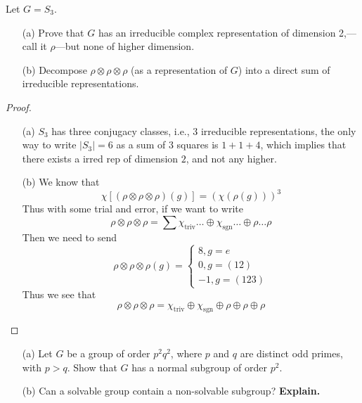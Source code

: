 \documentclass[openany]{book}
\begin{document}
\begin{prob}
    Let \(G = S_3\).
    \begin{itemize}
        \item[(a)] Prove that \(G\) has an irreducible complex representation of dimension 2,—call it \(\rho\)—but none of higher dimension.
        \item[(b)] Decompose \(\rho \otimes \rho \otimes \rho\) (as a representation of \(G\)) into a direct sum of irreducible representations.
    \end{itemize}
\end{prob}
\begin{proof}
    \begin{itemize}
        \item[(a)] $S_3$ has three conjugacy classes, i.e., $3$ irreducible representations, the only way to write $|S_3|=6$ as a sum of $3$ squares is $1+1+4$, which implies that there exists a irred rep of dimension $2$, and not any higher.
        \item[(b)] We know that 
        \begin{equation*}
            \chi\left[(\rho\otimes\rho\otimes\rho)(g)\right]=\left(\chi(\rho(g))\right)^3
        \end{equation*}
        Thus with some trial and error, if we want to write 
        \begin{equation*}
            \rho\otimes\rho\otimes\rho=\sum \chi_{\text{triv}}\dots\oplus\chi_{\text{sgn}}\dots \oplus\rho\dots\rho
        \end{equation*}
        Then we need to send 
        \begin{equation*}
            \rho\otimes\rho\otimes\rho(g)=\begin{cases}
                8, g=e\\
                0, g=(12)\\
                -1, g=(123)
            \end{cases}
        \end{equation*}
        Thus we see that 
        \begin{equation*}
            \rho\otimes\rho\otimes\rho=\chi_{\text{triv}}\oplus\chi_{\text{sgn}}\oplus\rho\oplus\rho\oplus\rho
        \end{equation*}
    \end{itemize}
\end{proof}



\begin{prob}
    \begin{itemize}
        \item[(a)] Let \(G\) be a group of order \(p^2q^2\), where \(p\) and \(q\) are distinct odd primes, with \(p > q\). Show that \(G\) has a normal subgroup of order \(p^2\).
        \item[(b)] Can a solvable group contain a non-solvable subgroup? \textbf{Explain.}
    \end{itemize}
\end{prob}
\end{document}
